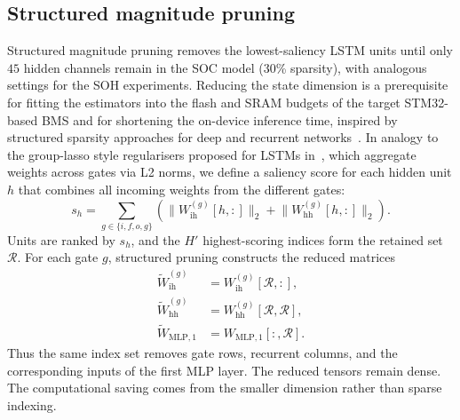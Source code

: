 \documentclass[final,3p,times]{elsarticle}
\begin{document}
\subsection{Structured magnitude pruning}
Structured magnitude pruning removes the lowest-saliency LSTM units until only $45$ hidden channels remain in the SOC model (30\% sparsity), with analogous settings for the SOH experiments. Reducing the state dimension is a prerequisite for fitting the estimators into the flash and SRAM budgets of the target STM32-based BMS and for shortening the on-device inference time, inspired by structured sparsity approaches for deep and recurrent networks~\cite{wenLearningStructuredSparsity2016,lobachevaStructuredSparsificationGated2020,narangExploringSparsityRecurrent2017}. In analogy to the group-lasso style regularisers proposed for LSTMs in~\cite{wenLearningStructuredSparsity2016,lobachevaStructuredSparsificationGated2020}, which aggregate weights across gates via L2 norms, we define a saliency score for each hidden unit $h$ that combines all incoming weights from the different gates:
\begin{equation}
    \label{eq:pruning_saliency}
    s_h = \sum_{g\in\{i,f,o,g\}} \left(\lVert W_{\mathrm{ih}}^{(g)}[h,:]\rVert_2 + \lVert W_{\mathrm{hh}}^{(g)}[h,:]\rVert_2\right).
\end{equation}
Units are ranked by $s_h$, and the $H'$ highest-scoring indices form the retained set $\mathcal{R}$. For each gate $g$, structured pruning constructs the reduced matrices
\begin{align}
    \widetilde{W}_{\mathrm{ih}}^{(g)} &= W_{\mathrm{ih}}^{(g)}[\mathcal{R},:],\nonumber\\
    \widetilde{W}_{\mathrm{hh}}^{(g)} &= W_{\mathrm{hh}}^{(g)}[\mathcal{R},\mathcal{R}],\nonumber\\
    \widetilde{W}_{\mathrm{MLP},1} &= W_{\mathrm{MLP},1}[:,\mathcal{R}].
    \label{eq:pruning_slicing}
\end{align}
Thus the same index set removes gate rows, recurrent columns, and the corresponding inputs of the first MLP layer. The reduced tensors remain dense. The computational saving comes from the smaller dimension rather than sparse indexing.
\end{document}
